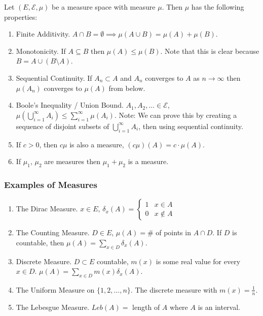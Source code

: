 \documentclass[12pt, titlepage]{article}
\begin{document}
\begin{info}{}
Let $(E, \mathcal{E}, \mu)$ be a measure space with measure $\mu$. Then $\mu$ has the following properties:\\

\begin{enumerate}
	\item Finite Additivity. $A \cap B = \emptyset \implies \mu (A \cup B) = \mu(A) + \mu(B)$.
	\item  Monotonicity. If $A \subseteq B$ then $\mu(A) \leq \mu(B)$. Note that this is clear because $B = A \cup (B \setminus A)$.
	\item  Sequential Continuity. If $A_n \subset A$ and $A_n$ converges to $A$ as $n \to \infty$ then $\mu(A_n)$ converges to $\mu(A)$ from below.
	\item Boole's Inequality / Union Bound. $A_1, A_2, \dots \in \mathcal{E}$, $\mu(\bigcup^\infty_{i = 1} A_i) \leq \sum_{i = 1}^\infty \mu(A_i)$. Note: We can prove this by creating a sequence of disjoint subsets of $\bigcup_{i = 1}^\infty A_i$, then using sequential continuity.
	\item If $c > 0$, then $c\mu$ is also a measure, $(c\mu)(A) = c \cdot \mu(A)$.
	\item If $\mu_1$, $\mu_2$ are measures then $\mu_1 + \mu_2$ is a measure.
\end{enumerate}
\end{info}

\subsubsection{Examples of Measures}
\begin{enumerate}
	\item The Dirac Measure. $x \in E$, $\delta_x(A) =
	\begin{cases}
	1 & x \in A\\
	0 & x \not \in A
	\end{cases}$
	\item The Counting Measure. $D \in E$, $\mu(A) = $\# of points in $A \cap D$. If $D$ is countable, then $\mu(A) = \sum_{x \in D} \delta_x(A)$.
	\item Discrete Measure. $D \subset E$ countable, $m(x)$ is some real value for every $x \in D$. $\mu(A) = \sum_{x \in D} m(x)\delta_x(A)$.
	\item The Uniform Measure on $\{1, 2, \dots, n\}$. The discrete measure with $m(x) = \frac{1}{n}$.
	\item The Lebesgue Measure. $Leb(A) =$ length of $A$ where $A$ is an interval.
\end{enumerate}
\end{document}

